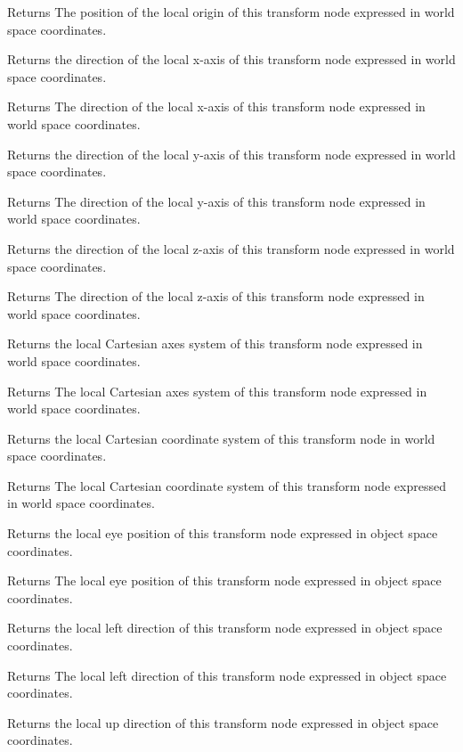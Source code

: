 \begin{DoxyReturn}{Returns}
The position of the local origin of this transform node expressed in world space coordinates.
\end{DoxyReturn}
Returns the direction of the local x-\/axis of this transform node expressed in world space coordinates.

\begin{DoxyReturn}{Returns}
The direction of the local x-\/axis of this transform node expressed in world space coordinates.
\end{DoxyReturn}
Returns the direction of the local y-\/axis of this transform node expressed in world space coordinates.

\begin{DoxyReturn}{Returns}
The direction of the local y-\/axis of this transform node expressed in world space coordinates.
\end{DoxyReturn}
Returns the direction of the local z-\/axis of this transform node expressed in world space coordinates.

\begin{DoxyReturn}{Returns}
The direction of the local z-\/axis of this transform node expressed in world space coordinates.
\end{DoxyReturn}
Returns the local Cartesian axes system of this transform node expressed in world space coordinates.

\begin{DoxyReturn}{Returns}
The local Cartesian axes system of this transform node expressed in world space coordinates.
\end{DoxyReturn}
Returns the local Cartesian coordinate system of this transform node in world space coordinates.

\begin{DoxyReturn}{Returns}
The local Cartesian coordinate system of this transform node expressed in world space coordinates.
\end{DoxyReturn}
Returns the local eye position of this transform node expressed in object space coordinates.

\begin{DoxyReturn}{Returns}
The local eye position of this transform node expressed in object space coordinates.
\end{DoxyReturn}
Returns the local left direction of this transform node expressed in object space coordinates.

\begin{DoxyReturn}{Returns}
The local left direction of this transform node expressed in object space coordinates.
\end{DoxyReturn}
Returns the local up direction of this transform node expressed in object space coordinates.

